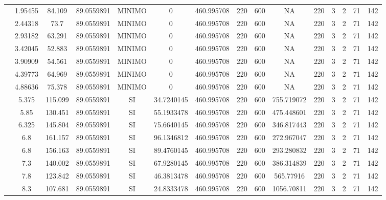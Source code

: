 \begin{table}[H]
{\begin{tabular}{|c|c|c|c|c|c|c|c|c|c|c|c|c|c|c|}
\cline{2-15}    & 1.95455 & 84.109 & 89.0559891 & MINIMO & 0   & 460.995708 & 220 & 600 & NA  & 220 & 3   & 2   & 71  & 142 \bigstrut\\
\cline{2-15}    & 2.44318 & 73.7 & 89.0559891 & MINIMO & 0   & 460.995708 & 220 & 600 & NA  & 220 & 3   & 2   & 71  & 142 \bigstrut\\
\cline{2-15}    & 2.93182 & 63.291 & 89.0559891 & MINIMO & 0   & 460.995708 & 220 & 600 & NA  & 220 & 3   & 2   & 71  & 142 \bigstrut\\
\cline{2-15}    & 3.42045 & 52.883 & 89.0559891 & MINIMO & 0   & 460.995708 & 220 & 600 & NA  & 220 & 3   & 2   & 71  & 142 \bigstrut\\
\cline{2-15}    & 3.90909 & 54.561 & 89.0559891 & MINIMO & 0   & 460.995708 & 220 & 600 & NA  & 220 & 3   & 2   & 71  & 142 \bigstrut\\
\cline{2-15}    & 4.39773 & 64.969 & 89.0559891 & MINIMO & 0   & 460.995708 & 220 & 600 & NA  & 220 & 3   & 2   & 71  & 142 \bigstrut\\
\cline{2-15}    & 4.88636 & 75.378 & 89.0559891 & MINIMO & 0   & 460.995708 & 220 & 600 & NA  & 220 & 3   & 2   & 71  & 142 \bigstrut\\
\cline{2-15}    & 5.375 & 115.099 & 89.0559891 & SI  & 34.7240145 & 460.995708 & 220 & 600 & 755.719072 & 220 & 3   & 2   & 71  & 142 \bigstrut\\
\cline{2-15}    & 5.85 & 130.451 & 89.0559891 & SI  & 55.1933478 & 460.995708 & 220 & 600 & 475.448601 & 220 & 3   & 2   & 71  & 142 \bigstrut\\
\cline{2-15}    & 6.325 & 145.804 & 89.0559891 & SI  & 75.6640145 & 460.995708 & 220 & 600 & 346.817443 & 220 & 3   & 2   & 71  & 142 \bigstrut\\
\cline{2-15}    & 6.8 & 161.157 & 89.0559891 & SI  & 96.1346812 & 460.995708 & 220 & 600 & 272.967047 & 220 & 3   & 2   & 71  & 142 \bigstrut\\
\cline{2-15}    & 6.8 & 156.163 & 89.0559891 & SI  & 89.4760145 & 460.995708 & 220 & 600 & 293.280832 & 220 & 3   & 2   & 71  & 142 \bigstrut\\
\cline{2-15}    & 7.3 & 140.002 & 89.0559891 & SI  & 67.9280145 & 460.995708 & 220 & 600 & 386.314839 & 220 & 3   & 2   & 71  & 142 \bigstrut\\
\cline{2-15}    & 7.8 & 123.842 & 89.0559891 & SI  & 46.3813478 & 460.995708 & 220 & 600 & 565.77916 & 220 & 3   & 2   & 71  & 142 \bigstrut\\
\cline{2-15}    & 8.3 & 107.681 & 89.0559891 & SI  & 24.8333478 & 460.995708 & 220 & 600 & 1056.70811 & 220 & 3   & 2   & 71  & 142 \bigstrut\\

\end{tabular}}
\end{table}
